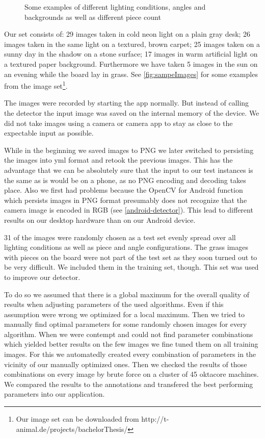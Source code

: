 \begin{figure}
		\caption{Some examples of different lighting conditions, angles and backgrounds as well as different piece count}
		\label{fig:sampeImages}
	\end{figure}

	Our set consists of: 29 images taken in cold neon light on a plain gray desk; 26 images taken in the same light on a textured, brown carpet; 25 images taken on a sunny day in the shadow on a stone surface; 17 images in warm artificial light on a textured paper background. Furthermore we have taken 5 images in the sun on an evening while the board lay in grass. See \autoref{fig:sampeImages} for some examples from the image set\footnote{Our image set can be downloaded from http://t-animal.de/projects/bachelorThesis/}.

	The images were recorded by starting the app normally. But instead of calling the detector the input image was saved on the internal memory of the device. We did not take images using a camera or camera app to stay as close to the expectable input as possible.

	While in the beginning we saved images to PNG we later switched to persisting the images into yml format and retook the previous images. This has the advantage that we can be absolutely sure that the input to our test instances is the same as is would be on a phone, as no PNG encoding and decoding takes place. Also we first had problems because the OpenCV for Android function which persists images in PNG format presumably does not recognize that the camera image is encoded in RGB (see \autoref{android-detector}). This lead to different results on our desktop hardware than on our Android device.

	31 of the images were randomly chosen as a test set evenly spread over all lighting conditions as well as piece and angle configurations. The grass images with pieces on the board were not part of the test set as they soon turned out to be very difficult. We included them in the training set, though. This set was used to improve our detector.

	To do so we assumed that there is a global maximum for the overall quality of results when adjusting parameters of the used algorithms. Even if this assumption were wrong we optimized for a local maximum. Then we tried to manually find optimal parameters for some randomly chosen images for every algorithm. When we were contempt and could not find parameter combinations which yielded better results on the few images we fine tuned them on all training images. For this we automatedly created every combination of parameters in the vicinity of our manually optimized ones. Then we checked the results of those combinations on every image by brute force on a cluster of 45 oktacore machines. We compared the results to the annotations and transfered the best performing parameters into our application.






